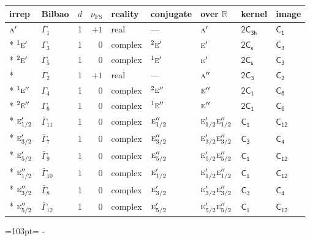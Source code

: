 \documentclass[10pt,a4paper]{article}
\makeatletter
\def\grouprule#1#2{\noalign{\marks\LTgroupmarks{\the\belowrulesep}\nobreak\vskip#1%
  \vskip\aboverulesep}\multispan\LT@cols\unskip{\leaders\hrule\@height#2\hfill\kern\z@}\cr
  \noalign{\penalty\LTrulebreak\vskip\belowrulesep\global\@lastruleclass\z@}}
\newcommand{\needspace}[1]{\par\penalty-100\begingroup\dimen0=#1\relax\dimen2=\pagegoal
  \advance\dimen2-\pagetotal\ifdim\dimen0>\dimen2\relax\ifdim\dimen2>0pt\vfil\break\fi\fi
  \endgroup}
\numberwithin{equation}{section}
\newcommand{\grp}[1]{\mathsf{#1}}
\newcommand{\irr}[1]{\text{\normalfont\scshape #1}}
\newcommand{\conjpair}[1]{{}^{#1}}
\newcommand{\detbox}[1]{{\setlength{\fboxsep}{1pt}\fbox{#1}}}
\newcommand{\fsind}{\nu_{\mathrm{FS}}}
\makeatother
\begin{document}
{\small\renewcommand{\arraystretch}{1.25}\setlength{\tabcolsep}{4pt}\begin{longtable}{@{}llrrlllll@{}}\toprule
irrep & Bilbao & $d$ & $\fsind$ & reality & conjugate & over $\mathbb{R}$ & kernel & image\\\midrule\endhead
\bottomrule\endfoot\endlastfoot
$\irr{a}'$ & $\Gamma_{1}$ & 1 & $+1$ & real & --- & $\irr{a}'$ & \href{2C3h.pdf}{$\grp{2C_{3h}}$} & \href{../../../rotation/data/pdf/C1.pdf}{$\grp{C_{1}}$}\\*
$\conjpair{1}\irr{e}'$ & $\Gamma_{3}$ & 1 & $0$ & complex & $\conjpair{2}\irr{e}'$ & $\irr{e}'$ & \href{2C1v.pdf}{$\grp{2C_{s}}$} & \href{../../../rotation/data/pdf/C3.pdf}{$\grp{C_{3}}$}\\*
$\conjpair{2}\irr{e}'$ & $\Gamma_{5}$ & 1 & $0$ & complex & $\conjpair{1}\irr{e}'$ & $\irr{e}'$ & \href{2C1v.pdf}{$\grp{2C_{s}}$} & \href{../../../rotation/data/pdf/C3.pdf}{$\grp{C_{3}}$}\\*
\detbox{$\irr{a}''$} & $\Gamma_{2}$ & 1 & $+1$ & real & --- & $\irr{a}''$ & \href{2C3.pdf}{$\grp{2C_{3}}$} & \href{../../../rotation/data/pdf/C2.pdf}{$\grp{C_{2}}$}\\*
$\conjpair{1}\irr{e}''$ & $\Gamma_{4}$ & 1 & $0$ & complex & $\conjpair{2}\irr{e}''$ & $\irr{e}''$ & \href{2C1.pdf}{$\grp{2C_{1}}$} & \href{../../../rotation/data/pdf/C6.pdf}{$\grp{C_{6}}$}\\*
$\conjpair{2}\irr{e}''$ & $\Gamma_{6}$ & 1 & $0$ & complex & $\conjpair{1}\irr{e}''$ & $\irr{e}''$ & \href{2C1.pdf}{$\grp{2C_{1}}$} & \href{../../../rotation/data/pdf/C6.pdf}{$\grp{C_{6}}$}\\*
\grouprule{0pt}{\lightrulewidth}
$\irr{e}_{1/2}'$ & $\bar{\Gamma}_{11}$ & 1 & $0$ & complex & $\irr{e}_{1/2}''$ & $\irr{e}_{1/2}'\irr{e}_{1/2}''$ & \href{C1.pdf}{$\grp{C_{1}}$} & \href{../../../rotation/data/pdf/C12.pdf}{$\grp{C_{12}}$}\\*
$\irr{e}_{3/2}'$ & $\bar{\Gamma}_{7}$ & 1 & $0$ & complex & $\irr{e}_{3/2}''$ & $\irr{e}_{3/2}'\irr{e}_{3/2}''$ & \href{C3.pdf}{$\grp{C_{3}}$} & \href{../../../rotation/data/pdf/C4.pdf}{$\grp{C_{4}}$}\\*
$\irr{e}_{5/2}'$ & $\bar{\Gamma}_{9}$ & 1 & $0$ & complex & $\irr{e}_{5/2}''$ & $\irr{e}_{5/2}'\irr{e}_{5/2}''$ & \href{C1.pdf}{$\grp{C_{1}}$} & \href{../../../rotation/data/pdf/C12.pdf}{$\grp{C_{12}}$}\\*
$\irr{e}_{1/2}''$ & $\bar{\Gamma}_{10}$ & 1 & $0$ & complex & $\irr{e}_{1/2}'$ & $\irr{e}_{1/2}'\irr{e}_{1/2}''$ & \href{C1.pdf}{$\grp{C_{1}}$} & \href{../../../rotation/data/pdf/C12.pdf}{$\grp{C_{12}}$}\\*
$\irr{e}_{3/2}''$ & $\bar{\Gamma}_{8}$ & 1 & $0$ & complex & $\irr{e}_{3/2}'$ & $\irr{e}_{3/2}'\irr{e}_{3/2}''$ & \href{C3.pdf}{$\grp{C_{3}}$} & \href{../../../rotation/data/pdf/C4.pdf}{$\grp{C_{4}}$}\\*
$\irr{e}_{5/2}''$ & $\bar{\Gamma}_{12}$ & 1 & $0$ & complex & $\irr{e}_{5/2}'$ & $\irr{e}_{5/2}'\irr{e}_{5/2}''$ & \href{C1.pdf}{$\grp{C_{1}}$} & \href{../../../rotation/data/pdf/C12.pdf}{$\grp{C_{12}}$}\\
\bottomrule\end{longtable}}
\needspace{103pt}
\end{document}
